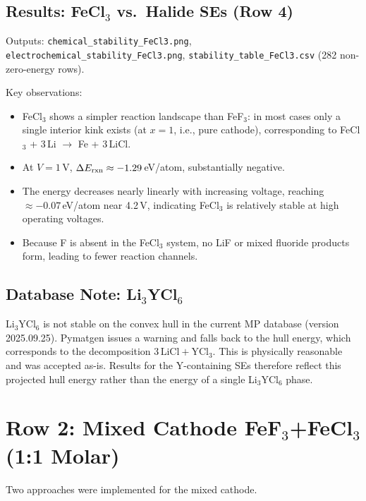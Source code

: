 \documentclass[11pt,letterpaper]{article}
\begin{document}
\subsection{Results: FeCl$_3$ vs.\ Halide SEs (Row 4)}

Outputs: \texttt{chemical\_stability\_FeCl3.png},
\texttt{electrochemical\_stability\_FeCl3.png},
\texttt{stability\_table\_FeCl3.csv} (282 non-zero-energy rows).

Key observations:
\begin{itemize}
  \item FeCl$_3$ shows a simpler reaction landscape than FeF$_3$:
        in most cases only a single interior kink exists (at $x=1$,
        i.e., pure cathode), corresponding to FeCl$_3$ + 3\,Li $\to$ Fe + 3\,LiCl.
  \item At $V=1$\,V, $\Delta E_{\rm rxn} \approx -1.29$\,eV/atom,
        substantially negative.
  \item The energy decreases nearly linearly with increasing voltage,
        reaching $\approx -0.07$\,eV/atom near 4.2\,V,
        indicating FeCl$_3$ is relatively stable at high operating voltages.
  \item Because F is absent in the FeCl$_3$ system, no LiF or mixed
        fluoride products form, leading to fewer reaction channels.
\end{itemize}

\subsection{Database Note: Li$_3$YCl$_6$}

Li$_3$YCl$_6$ is not stable on the convex hull in the current MP
database (version 2025.09.25). Pymatgen issues a warning and falls
back to the hull energy, which corresponds to the decomposition
$3\,\text{LiCl} + \text{YCl}_3$. This is physically reasonable and
was accepted as-is. Results for the Y-containing SEs therefore reflect
this projected hull energy rather than the energy of a single
Li$_3$YCl$_6$ phase.

\section{Row 2: Mixed Cathode FeF$_3$+FeCl$_3$ (1:1 Molar)}

Two approaches were implemented for the mixed cathode.
\end{document}
